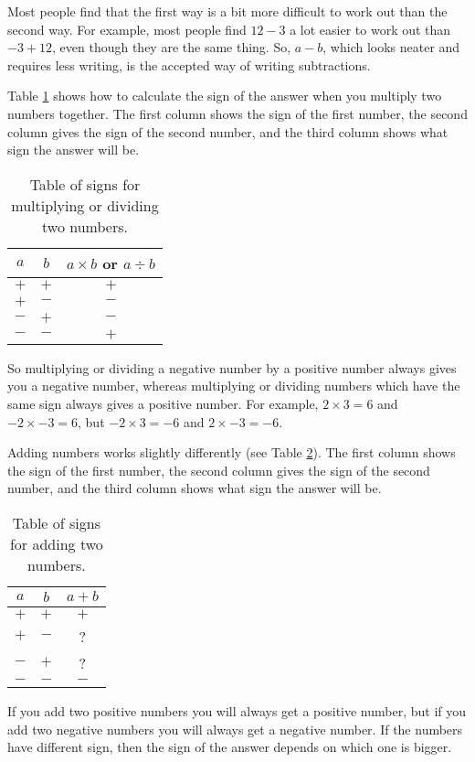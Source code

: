 \documentclass[10pt,a4paper,titlepage,twoside,openright]{report}
\begin{document}
Most people find that the first way is a bit more difficult to work out than the
second way. For example, most people find $12-3$ a lot easier to work out than
$-3+12$, even though they are the same thing. So, $a-b$, which looks neater and
requires less writing, is the accepted way of writing subtractions. 

Table \ref{tab:n:alg:multsgn} shows how to calculate the sign of the answer when
you multiply two numbers together. The first column shows the sign of the first
number, the second column gives the sign of the second number, and the third
column shows what sign the answer will be.
\begin{table}[!h]
  \centering
  \begin{tabular}{|c|c|c|}\hline
    $a$ & $b$ & $a\times b$ or $a\div b$\\\hline\hline
    $+$ & $+$ & $+$ \\\hline
    $+$ & $-$ & $-$ \\\hline
    $-$ & $+$ & $-$ \\\hline
    $-$ & $-$ & $+$\\\hline
  \end{tabular}
  \caption{Table of signs for multiplying or dividing two numbers.}
  \label{tab:n:alg:multsgn}
\end{table}
So multiplying or dividing a negative number by a positive number always gives
you a negative number, whereas multiplying or dividing numbers which have the
same sign always gives a positive number. For example, $2\times3=6$ and
$-2\times-3=6$, but $-2\times3=-6$ and $2\times-3=-6$.

Adding numbers works slightly differently (see Table
\ref{tab:n:alg:addsgn}). The first column shows the sign of the first number, the
second column gives the sign of the second number, and the third column shows
what sign the answer will be.

\begin{table}[!h]
  \centering
  \begin{tabular}{|c|c|c|}\hline
    $a$ & $b$ & $a+b$\\\hline\hline
    $+$ & $+$ & $+$ \\\hline
    $+$ & $-$ & ? \\\hline
    $-$ & $+$ & ? \\\hline
    $-$ & $-$ & $-$\\\hline
  \end{tabular}
  \caption{Table of signs for adding two numbers.}
  \label{tab:n:alg:addsgn}
\end{table}
If you add two positive numbers you will always get a positive number, but if
you add two negative numbers you will always get a negative number. If the
numbers have different sign, then the sign of the answer depends on which one is
bigger.
\end{document}

